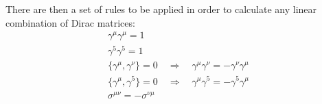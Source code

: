 \documentclass[a4paper,10pt]{article}
\begin{document}
There are then a set of rules to be applied in order to calculate any linear combination of Dirac matrices:
\begin{displaymath}
 \begin{array}{l}
 \gamma^{\mu}\gamma^{\mu}=1 \\
 \gamma^{5}\gamma^{5}=1 \\
 \{\gamma^{\mu},\gamma^{\nu}\}=0 \quad \Rightarrow \quad \gamma^{\mu}\gamma^{\nu}=-\gamma^{\nu}\gamma^{\mu} \\
 \{\gamma^{\mu},\gamma^{5}\}=0 \quad \Rightarrow \quad \gamma^{\mu}\gamma^{5}=-\gamma^{5}\gamma^{\mu} \\
 \sigma^{\mu\nu}=-\sigma^{\nu\mu}
\end{array}
\end{displaymath}
\end{document}
